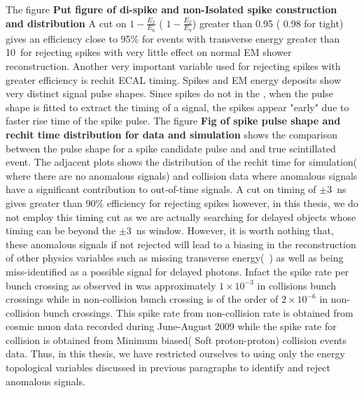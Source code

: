 The figure {\textbf{Put figure of di-spike and non-Isolated spike construction and distribution}}  
A cut on $ 1 - \frac{E_{2}}{E_{6}} $ ( $ 1 - \frac{E_{2}}{E_{9}} $)  greater than 0.95 ( 0.98 for tight) gives an efficiency close to 95\% for events with transverse energy greater than 10~\GeV for rejecting spikes with very little effect on normal EM shower reconstruction.
\newline
Another very important variable used for rejecting spikes with greater efficiency is rechit ECAL timing. Spikes and EM energy deposits show very distinct signal pulse shapes. Since spikes do not  in the \pb , when the pulse shape is fitted to extract the timing of a signal, the spikes appear "early" due to faster rise time of the spike pulse.
The figure {\textbf{Fig of spike pulse shape and rechit time distribution for data and simulation}} shows the comparison between the pulse shape for a spike candidate pulse and and true \pb scintillated event. The adjacent plots shows the distribution of the rechit time for simulation( where  there are no anomalous signals) and collision data where anomalous signals have a significant contribution to out-of-time signals.%
A cut on timing of $ \pm 3$~ns gives greater than 90\% efficiency for rejecting spikes however, in this thesis, we do not employ this timing cut as we are actually searching for delayed objects whose timing can be beyond the $\pm 3$~ns window.
\newline
However, it is worth nothing that, these anomalous signals if not rejected will lead to a biasing in the reconstruction of other physics variables such as missing transverse energy(~\MET) as well as being miss-identified as a possible signal for delayed photons.
Infact the spike rate per bunch crossing as observed in \cite{spike2} was approximately $ 1 \times 10^{-3}$ in collisions bunch crossings while in non-collision bunch crossing is of the order of $2 \times 10^{-6}$ in non-collision bunch crossings. This spike rate from non-collision rate is obtained from cosmic muon data recorded during June-August 2009 while the spike rate for collision is obtained from Minimum biased( Soft proton-proton) collision events data.
Thus, in this thesis, we have restricted ourselves to using only the energy topological variables discussed in previous paragraphs to identify and reject anomalous signals.


